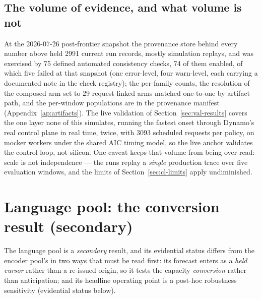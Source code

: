 \subsection{The volume of evidence, and what volume is not}
\label{sec:cl-ledger-scale}

At the 2026-07-26 post-frontier snapshot the provenance store behind every
number above held \num{2991} current run records, mostly simulation replays,
and was exercised by 75 defined automated
consistency checks, 74 of them enabled, of which five failed at
that snapshot (one error-level, four warn-level, each carrying a documented
note in the check registry); the per-family counts, the resolution of the
composed arm set to 29 request-linked arms matched one-to-one by artifact
path, and the per-window populations are in the provenance manifest
(Appendix~\ref{ap:artifacts}). The live validation of
Section~\ref{sec:val-results} covers the one layer none of this simulates, running
the fastest onset through Dynamo's real control plane in real time, twice, with
\num{3093} scheduled requests per policy, on mocker workers under the shared
AIC timing model, so the live anchor validates the control loop, not silicon.
One caveat keeps that volume from being over-read: scale is not independence
--- the runs replay a \emph{single} production trace over five evaluation
windows, and the limits of Section~\ref{sec:cl-limits} apply undiminished.

\makeatletter
\let\cl@svsectionmark\sectionmark
\let\sectionmark\@gobble
\section{Language pool: the conversion result (secondary)}
\let\sectionmark\cl@svsectionmark
\makeatother
{}
\label{sec:cl-llm}

The language pool is a \emph{secondary} result, and its evidential status
differs from the encoder pool's in two ways that must be read first: its
forecast enters as a \emph{held cursor} rather than a re-issued origin, so it
tests the capacity \emph{conversion} rather than anticipation; and its headline
operating point is a post-hoc robustness sensitivity (evidential status
below).


